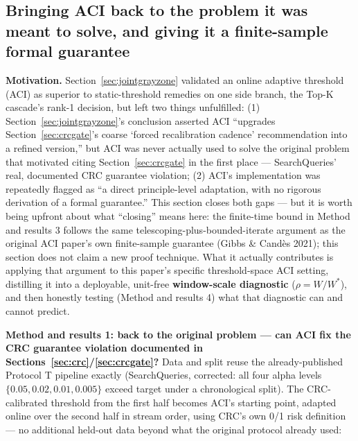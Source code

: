 \documentclass[11pt]{article}
\begin{document}
\subsection{Bringing ACI back to the problem it was meant to solve, and giving it a finite-sample formal guarantee}
\label{sec:acitheorem}

\textbf{Motivation.} Section~\ref{sec:jointgrayzone} validated an online adaptive threshold (ACI) as superior to static-threshold remedies on one side branch, the Top-K cascade's rank-1 decision, but left two things unfulfilled: (1) Section~\ref{sec:jointgrayzone}'s conclusion asserted ACI ``upgrades Section~\ref{sec:crcgate}'s coarse `forced recalibration cadence' recommendation into a refined version,'' but ACI was never actually used to solve the original problem that motivated citing Section~\ref{sec:crcgate} in the first place --- SearchQueries' real, documented CRC guarantee violation; (2) ACI's implementation was repeatedly flagged as ``a direct principle-level adaptation, with no rigorous derivation of a formal guarantee.'' This section closes both gaps --- but it is worth being upfront about what ``closing'' means here: the finite-time bound in Method and results 3 follows the same telescoping-plus-bounded-iterate argument as the original ACI paper's own finite-sample guarantee (Gibbs \& Cand\`es 2021); this section does not claim a new proof technique. What it actually contributes is applying that argument to this paper's specific threshold-space ACI setting, distilling it into a deployable, unit-free \textbf{window-scale diagnostic} ($\rho = W/W^*$), and then honestly testing (Method and results 4) what that diagnostic can and cannot predict.

\textbf{Method and results 1: back to the original problem --- can ACI fix the CRC guarantee violation documented in Sections~\ref{sec:crc}/\ref{sec:crcgate}?} Data and split reuse the already-published Protocol T pipeline exactly (SearchQueries, corrected: all four alpha levels $\{0.05, 0.02, 0.01, 0.005\}$ exceed target under a chronological split). The CRC-calibrated threshold from the first half becomes ACI's starting point, adapted online over the second half in stream order, using CRC's own 0/1 risk definition --- no additional held-out data beyond what the original protocol already used:
\end{document}
